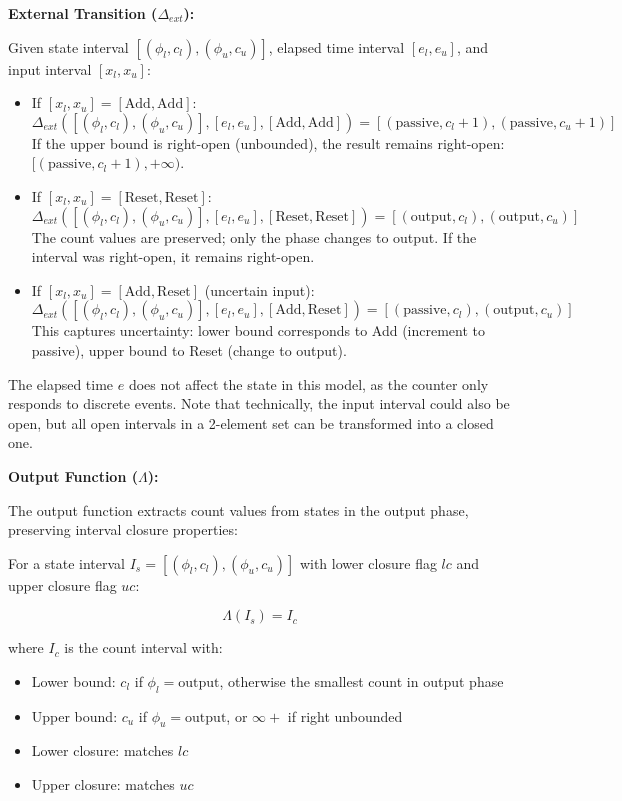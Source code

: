 \bigskip

\textbf{External Transition ($\Delta_{ext}$):}

Given state interval $[(\phi_l, c_l), (\phi_u, c_u)]$, elapsed time interval $[e_l, e_u]$, and input interval $[x_l, x_u]$:

\begin{itemize}
    \item If $[x_l, x_u] = [\text{Add}, \text{Add}]$:
    \[
    \Delta_{ext}([(\phi_l, c_l), (\phi_u, c_u)], [e_l, e_u], [\text{Add}, \text{Add}]) = [(\text{passive}, c_l + 1), (\text{passive}, c_u + 1)]
    \]
    If the upper bound is right-open (unbounded), the result remains right-open: $[(\text{passive}, c_l + 1), +\infty)$.
    
    \item If $[x_l, x_u] = [\text{Reset}, \text{Reset}]$:
    \[
    \Delta_{ext}([(\phi_l, c_l), (\phi_u, c_u)], [e_l, e_u], [\text{Reset}, \text{Reset}]) = [(\text{output}, c_l), (\text{output}, c_u)]
    \]
    The count values are preserved; only the phase changes to output. If the interval was right-open, it remains right-open.
    
    \item If $[x_l, x_u] = [\text{Add}, \text{Reset}]$ (uncertain input):
    \[
    \Delta_{ext}([(\phi_l, c_l), (\phi_u, c_u)], [e_l, e_u], [\text{Add}, \text{Reset}]) = [(\text{passive}, c_l), (\text{output}, c_u)]
    \]
    This captures uncertainty: lower bound corresponds to Add (increment to passive), upper bound to Reset (change to output).
\end{itemize}

The elapsed time $e$ does not affect the state in this model, as the counter only responds to discrete events.
Note that technically, the input interval could also be open, but all open intervals in a 2-element set can be transformed into a closed one.

\bigskip

\textbf{Output Function ($\Lambda$):}

The output function extracts count values from states in the output phase, preserving interval closure properties:

For a state interval $I_s = [ (\phi_l, c_l), (\phi_u, c_u) ]$ with lower closure flag $lc$ and upper closure flag $uc$:

\[
\Lambda(I_s) = I_c
\]

where $I_c$ is the count interval with:
\begin{itemize}
    \item Lower bound: $c_l$ if $\phi_l = \text{output}$, otherwise the smallest count in output phase
    \item Upper bound: $c_u$ if $\phi_u = \text{output}$, or $\infty+$ if right unbounded
    \item Lower closure: matches $lc$ 
    \item Upper closure: matches $uc$
\end{itemize}

